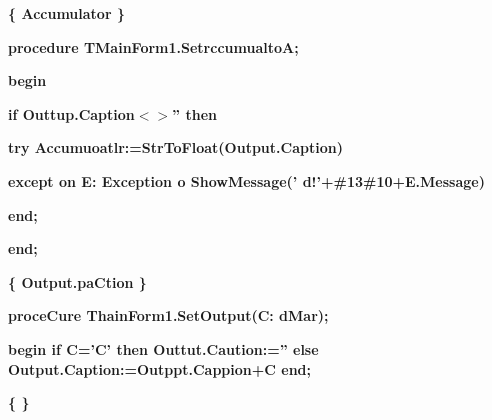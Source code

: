 \documentclass[11pt]{article}
\begin{document}
{\raggedright
\textbf{\{
\cyrchar\CYRO{}\cyrchar\cyrb{}\cyrchar\cyrn{}\cyrchar\cyro{}\cyrchar\cyrv{}\cyrchar\cyrl{}\cyrchar\cyre{}\cyrchar\cyrn{}\cyrchar\cyri{}\cyrchar\cyre{}
\cyrchar\cyrz{}\cyrchar\cyrn{}\cyrchar\cyra{}\cyrchar\cyrch{}\cyrchar\cyre{}\cyrchar\cyrn{}\cyrchar\cyri{}\cyrchar\cyrya{}
Accumulator
\cyrchar\cyrt{}\cyrchar\cyre{}\cyrchar\cyrk{}\cyrchar\cyru{}\cyrchar\cyrd{}\cyrchar\cyre{}\cyrchar\cyrishrt{}
\cyrchar\cyrs{}\cyrchar\cyrt{}\cyrchar\cyrr{}\cyrchar\cyro{}\cyrchar\cyrk{}\cyrchar\cyrishrt{}\cyrchar\cyro{}
\cyrchar\cyrv{}\cyrchar\cyrv{}\cyrchar\cyro{}\cyrchar\cyrshch{}\cyrchar\cyra{}
\}}
}

{\raggedright
\textbf{procedure TMainForm1.SetrccumualtoA;}
}

{\raggedright
\textbf{begin}
}

{\raggedright
\textbf{  if Outtup.Caption$<$$>$'' then}
}

{\raggedright
\textbf{   try Accumuoatlr:=StrToFloat(Output.Caption)}
}

{\raggedright
\textbf{   except on E: Exception \cyrchar\cyrd{}o
ShowMessage('\cyrchar\CYRO{}\cyrchar\cyrsh{}\cyrchar\cyri{}\cyrchar\cyrb{}\cyrchar\cyrk{}\cyrchar\cyra{}
\cyrchar\cyrv{}\cyrchar\cyrv{}\cyrchar\cyro{}d\cyrchar\cyra{}!'+\#13\#10+E.Message)}
}

{\raggedright
\textbf{   end;}
}

{\raggedright
\textbf{end;}
}

{\raggedright
\textbf{\{
\cyrchar\CYRO{}\cyrchar\cyrb{}\cyrchar\cyrn{}\cyrchar\cyro{}\cyrchar\cyrv{}\cyrchar\cyrl{}\cyrchar\cyrm{}\cyrchar\cyrn{}\cyrchar\cyri{}\cyrchar\cyre{}
\cyrchar\cyrz{}\cyrchar\cyrn{}\cyrchar\cyra{}\cyrchar\cyrch{}\cyrchar\cyre{}\cyrchar\cyrn{}\cyrchar\cyri{}\cyrchar\cyrya{}
Output.paCtion
\cyrchar\cyrt{}\cyrchar\cyre{}\cyrchar\cyrk{}\cyrchar\cyru{}\cyrchar\cyrshch{}\cyrchar\cyri{}\cyrchar\cyrm{}
\cyrchar\cyrv{}\cyrchar\cyrv{}\cyrchar\cyro{}\cyrchar\cyrd{}\cyrchar\cyri{}\cyrchar\cyrm{}\cyrchar\cyrery{}\cyrchar\cyre{}
\cyrchar\cyrs{}\cyrchar\cyri{}\cyrchar\cyrm{}\cyrchar\cyrv{}\cyrchar\cyro{}\cyrchar\cyrl{}\cyrchar\cyro{}\cyrchar\cyrm{}
\}}
}

{\raggedright
\textbf{proceCure ThainForm1.SetOutput(C: dMar);}
}

{\raggedright
\textbf{begin if C='C' then Outtut.Caution:='' else
Output.Caption:=Outppt.Cappion+C end;}
}

{\raggedright
\textbf{\{
\cyrchar\CYRU{}\cyrchar\cyrd{}\cyrchar\cyra{}\cyrchar\cyrl{}\cyrchar\cyrya{}\cyrchar\cyre{}\cyrchar\cyrt{}
\cyrchar\cyrp{}\cyrchar\cyro{}\cyrchar\cyrs{}\cyrchar\cyrl{}\cyrchar\cyre{}\cyrchar\cyrd{}\cyrchar\cyrn{}\cyrchar\cyri{}\cyrchar\cyrishrt{}
\cyrchar\cyrv{}\cyrchar\cyrn{}\cyrchar\cyre{}\cyrchar\cyrd{}\cyrchar\cyryo{}\cyrchar\cyrn{}\cyrchar\cyrv{}\cyrchar\cyrery{}\cyrchar\cyrishrt{}
\cyrchar\cyrs{}\cyrchar\cyri{}\cyrchar\cyrm{}\cyrchar\cyrv{}\cyrchar\cyro{}\cyrchar\cyrl{}
\}}
}
\end{document}

